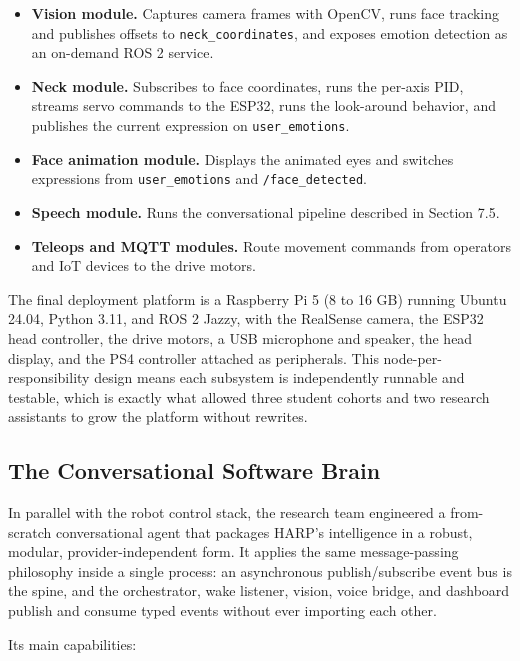 \documentclass[11pt,a4paper]{article}
\begin{document}
\begin{itemize}
\item \textbf{Vision module.} Captures camera frames with OpenCV, runs face tracking and publishes offsets to \texttt{neck\_coordinates}, and exposes emotion detection as an on-demand ROS 2 service.
\item \textbf{Neck module.} Subscribes to face coordinates, runs the per-axis PID, streams servo commands to the ESP32, runs the look-around behavior, and publishes the current expression on \texttt{user\_emotions}.
\item \textbf{Face animation module.} Displays the animated eyes and switches expressions from \texttt{user\_emotions} and \texttt{/face\_detected}.
\item \textbf{Speech module.} Runs the conversational pipeline described in Section 7.5.
\item \textbf{Teleops and MQTT modules.} Route movement commands from operators and IoT devices to the drive motors.
\end{itemize}

The final deployment platform is a Raspberry Pi 5 (8 to 16 GB) running Ubuntu 24.04, Python 3.11, and ROS 2 Jazzy, with the RealSense camera, the ESP32 head controller, the drive motors, a USB microphone and speaker, the head display, and the PS4 controller attached as peripherals. This node-per-responsibility design means each subsystem is independently runnable and testable, which is exactly what allowed three student cohorts and two research assistants to grow the platform without rewrites.

\subsection{The Conversational Software Brain}
\label{sec:brain}

In parallel with the robot control stack, the research team engineered a from-scratch conversational agent that packages HARP's intelligence in a robust, modular, provider-independent form. It applies the same message-passing philosophy inside a single process: an asynchronous publish/subscribe event bus is the spine, and the orchestrator, wake listener, vision, voice bridge, and dashboard publish and consume typed events without ever importing each other.

Its main capabilities:
\end{document}
